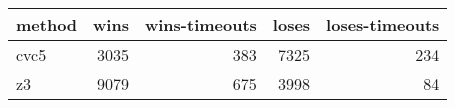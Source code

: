 \begin{tabular}{lrrrr}
\hline
 method   &   wins &   wins-timeouts &   loses &   loses-timeouts \\
\hline
 cvc5     &   3035 &             383 &    7325 &              234 \\
 z3       &   9079 &             675 &    3998 &               84 \\
\hline
\end{tabular}
